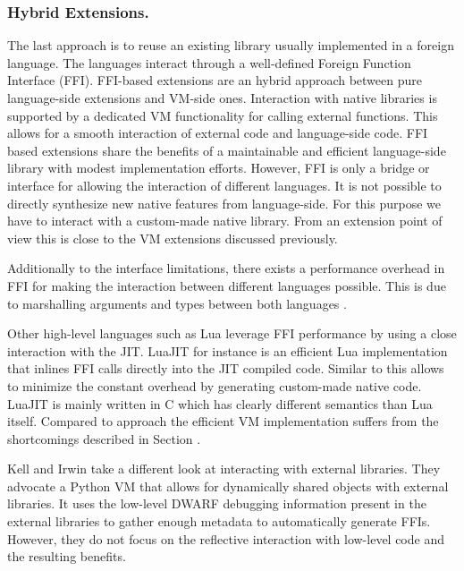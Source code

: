 \vspace{-5mm}
\subsubsection{Hybrid Extensions.}
The last approach is to reuse an existing library usually implemented in a foreign language.
The languages interact through a well-defined Foreign Function Interface (FFI).
FFI-based extensions are an hybrid approach between pure language-side extensions and VM-side ones.
Interaction with native libraries is supported by a dedicated VM functionality for calling external functions.
This allows for a smooth interaction of external code and language-side code.
FFI based extensions share the benefits of a maintainable and efficient language-side library with modest implementation efforts.
However, FFI is only a bridge or interface for allowing the interaction of different languages. 
It is not possible to directly synthesize new native features from language-side.
For this purpose we have to interact with a custom-made native library.
From an extension point of view this is close to the VM extensions discussed previously.

Additionally to the interface limitations, there exists a performance overhead in FFI for making the interaction between different languages possible. 
This is due to marshalling arguments and types between both languages \cite{Fish00a,Repp06b}.


Other high-level languages such as Lua leverage FFI performance by using a close interaction with the JIT.
LuaJIT \cite{luaffi} for instance is an efficient Lua implementation that inlines FFI calls directly into the JIT compiled code.
Similar to \B this allows to minimize the constant overhead by generating custom-made native code.
LuaJIT is mainly written in C which has clearly different semantics than Lua itself.
Compared to  approach the efficient VM implementation suffers from the shortcomings described in Section . 

Kell and Irwin \cite{Kell11a} take a different look at interacting with external libraries.
They advocate a Python VM that allows for dynamically shared objects with external libraries.
It uses the low-level DWARF debugging information present in the external libraries to gather enough metadata to automatically generate FFIs.
However, they do not focus on the reflective interaction with low-level code and the resulting benefits. 

